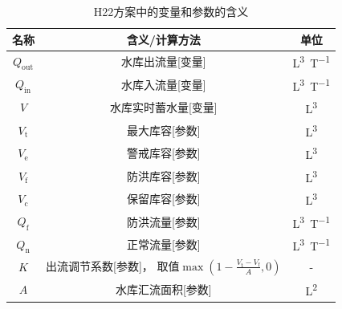 \begin{table}[htbp]
  \centering
  \caption{H22方案中的变量和参数的含义}
  \label{tab:H22方案变量参数表}
  \begin{tabular}{ccc}
    \toprule
    名称                                                                & 含义/计算方法                   & 单位              \\ \midrule
    $Q_{\mathrm{out}}$                                                  & 水库出流量[变量]                & \unit{L^3.T^{-1}} \\
    $Q_{\mathrm{in}}$                                                   & 水库入流量[变量]                & \unit{L^3.T^{-1}} \\
    $V$                                                                 & 水库实时蓄水量[变量]            & \unit{L^3}        \\
    $V_{\mathrm{t}}$                                                    & 最大库容[参数]                  & \unit{L^3}        \\
    $V_{\mathrm{e}}$                                                    & 警戒库容[参数]                  & \unit{L^3}        \\
    $V_{\mathrm{f}}$                                                    & 防洪库容[参数]                  & \unit{L^3}        \\
    $V_{\mathrm{c}}$                                                    & 保留库容[参数]                  & \unit{L^3}        \\
    $Q_{\mathrm{f}}$                                                    & 防洪流量[参数]                  & \unit{L^3.T^{-1}} \\
    $Q_{\mathrm{n}}$                                                    & 正常流量[参数]                  & \unit{L^3.T^{-1}} \\
    $K$                                                                 & \makecell{出流调节系数[参数]， \\
    取值$\max\left(1-\frac{V_{\mathrm{t}}-V_{\mathrm{f}}}{A},0\right)$} & -                              \\
    $A$                                                                 & 水库汇流面积[参数]              & \unit{L^2}        \\
    \bottomrule
  \end{tabular}
\end{table}

